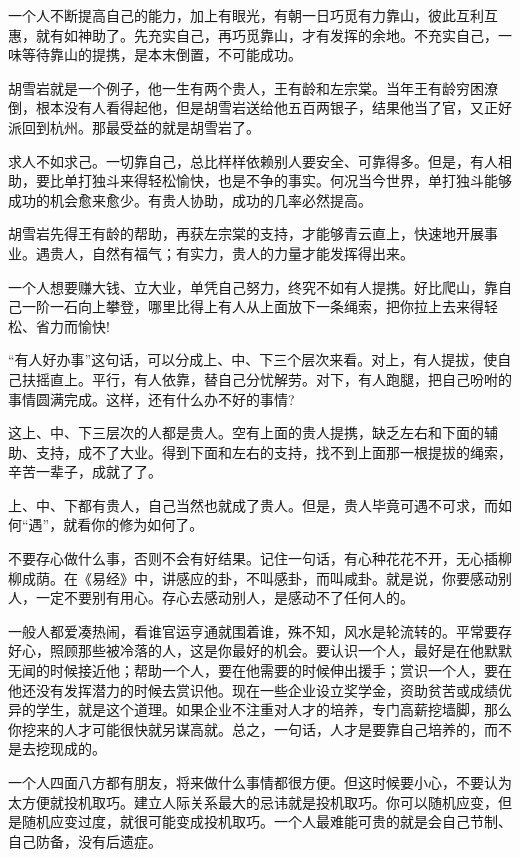 \documentclass[fontset=fandol, a4paper, 12pt, openright]{ctexbook}
\begin{document}
一个人不断提高自己的能力，加上有眼光，有朝一日巧觅有力靠山，彼此互利互惠，就有如神助了。先充实自己，再巧觅靠山，才有发挥的余地。不充实自己，一味等待靠山的提携，是本末倒置，不可能成功。

胡雪岩就是一个例子，他一生有两个贵人，王有龄和左宗棠。当年王有龄穷困潦倒，根本没有人看得起他，但是胡雪岩送给他五百两银子，结果他当了官，又正好派回到杭州。那最受益的就是胡雪岩了。

求人不如求己。一切靠自己，总比样样依赖别人要安全、可靠得多。但是，有人相助，要比单打独斗来得轻松愉快，也是不争的事实。何况当今世界，单打独斗能够成功的机会愈来愈少。有贵人协助，成功的几率必然提高。

胡雪岩先得王有龄的帮助，再获左宗棠的支持，才能够青云直上，快速地开展事业。遇贵人，自然有福气；有实力，贵人的力量才能发挥得出来。

一个人想要赚大钱、立大业，单凭自己努力，终究不如有人提携。好比爬山，靠自己一阶一石向上攀登，哪里比得上有人从上面放下一条绳索，把你拉上去来得轻松、省力而愉快!

“有人好办事”这句话，可以分成上、中、下三个层次来看。对上，有人提拔，使自己扶摇直上。平行，有人依靠，替自己分忧解劳。对下，有人跑腿，把自己吩咐的事情圆满完成。这样，还有什么办不好的事情?

这上、中、下三层次的人都是贵人。空有上面的贵人提携，缺乏左右和下面的辅助、支持，成不了大业。得到下面和左右的支持，找不到上面那一根提拔的绳索，辛苦一辈子，成就了了。

上、中、下都有贵人，自己当然也就成了贵人。但是，贵人毕竟可遇不可求，而如何“遇”，就看你的修为如何了。

不要存心做什么事，否则不会有好结果。记住一句话，有心种花花不开，无心插柳柳成荫。在《易经》中，讲感应的卦，不叫感卦，而叫咸卦。就是说，你要感动别人，一定不要别有用心。存心去感动别人，是感动不了任何人的。

一般人都爱凑热闹，看谁官运亨通就围着谁，殊不知，风水是轮流转的。平常要存好心，照顾那些被冷落的人，这是你最好的机会。要认识一个人，最好是在他默默无闻的时候接近他；帮助一个人，要在他需要的时候伸出援手；赏识一个人，要在他还没有发挥潜力的时候去赏识他。现在一些企业设立奖学金，资助贫苦或成绩优异的学生，就是这个道理。如果企业不注重对人才的培养，专门高薪挖墙脚，那么你挖来的人才可能很快就另谋高就。总之，一句话，人才是要靠自己培养的，而不是去挖现成的。

一个人四面八方都有朋友，将来做什么事情都很方便。但这时候要小心，不要认为太方便就投机取巧。建立人际关系最大的忌讳就是投机取巧。你可以随机应变，但是随机应变过度，就很可能变成投机取巧。一个人最难能可贵的就是会自己节制、自己防备，没有后遗症。
\end{document}
